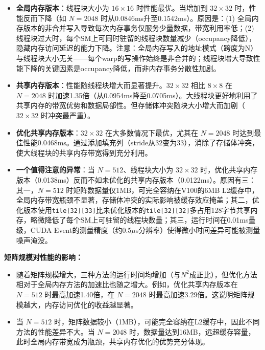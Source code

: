 \documentclass{SYSUReport}
\begin{document}
\begin{itemize}
    \item \textbf{全局内存版本}：线程块大小为 $16\times16$ 时性能最优。当增加到 $32\times32$ 时，性能反而下降（如 $N=2048$ 时从0.0846ms升至0.1542ms）。原因是：(1) 全局内存版本的非合并写入导致每次内存事务仅服务少量数据，带宽利用率低；(2) 线程块过大时，每个SM上可同时驻留的线程块数量减少（occupancy降低），隐藏内存访问延迟的能力下降。注意：全局内存写入的地址模式（跨度为N）与线程块大小无关——每个warp的写操作始终是非合并的；线程块增大导致性能下降的关键因素是occupancy降低，而非内存事务分散性加剧。

    \item \textbf{共享内存版本}：性能随线程块增大而显著提升。$32\times32$ 相比 $8\times8$ 在 $N=2048$ 时加速1.35倍（从0.0954ms降至0.0705ms）。大线程块更好地利用了共享内存的带宽优势和数据局部性。但存储体冲突随块大小增大而加剧（$32\times32$ 时冲突最严重）。

    \item \textbf{优化共享内存版本}：$32\times32$ 在大多数情况下最优，尤其在 $N=2048$ 时达到最佳性能0.0468ms。通过添加填充列（stride从32变为33），消除了存储体冲突，使大线程块的共享内存带宽得到充分利用。

    \item \textbf{一个值得注意的异常}：当 $N=512$、线程块大小为 $32\times32$ 时，优化共享内存版本（0.0138ms）反而不如未优化的共享内存版本（0.0122ms）。原因有三：其一，$N=512$ 时矩阵数据量仅1MB，可完全容纳在V100的6MB L2缓存中，全局内存带宽瓶颈不显著，存储体冲突的实际影响被缓存效应掩盖；其二，优化版本使用\texttt{tile[32][33]}比未优化版本的\texttt{tile[32][32]}多占用128字节共享内存，略微降低了每个SM上可驻留的线程块数量；其三，运行时间在0.01ms量级，CUDA Event的测量精度（约0.5$\mu$s分辨率）使得微小时间差异可能被测量噪声淹没。
\end{itemize}

\textbf{矩阵规模对性能的影响：}

\begin{itemize}
    \item 随着矩阵规模增大，三种方法的运行时间均增加（与$N^2$成正比），但优化方法相对于全局内存方法的加速比也随之增大。例如，优化共享内存版本在 $N=512$ 时最高加速1.40倍，在 $N=2048$ 时最高加速3.29倍。这说明矩阵规模越大，内存访问优化的收益越显著。

    \item 当 $N=512$ 时，矩阵数据较小（1MB），可能完全容纳在L2缓存中，因此不同方法的性能差异不大。当 $N=2048$ 时，数据量达到16MB，远超缓存容量，此时全局内存带宽成为瓶颈，共享内存优化的优势充分体现。
\end{itemize}
\end{document}
